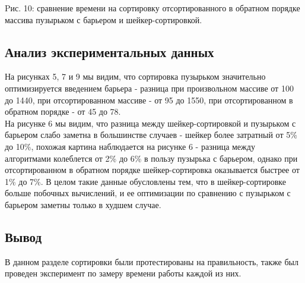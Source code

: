 \documentclass[a4paper, 14pt]{article}
\begin{document}
\begin{center}
\begin{flushleft}
Pис. 10: сравнение времени на сортировку отсортированного в обратном порядке массива пузырьком с барьером и шейкер-сортировкой.\\
\end{flushleft}
\end{center}
\subsection{Анализ экспериментальных данных}
	На рисунках 5, 7 и 9 мы видим, что сортировка пузырьком значительно оптимизируется введением барьера - разница при произвольном массиве от 100 до 1440, при отсортированном массиве - от 95 до 1550, при отсортированном в обратном порядке - от 45 до 78.\\
	На рисунке 6 мы видим, что разница между шейкер-сортировкой и пузырьком с барьером слабо заметна в большинстве случаев - шейкер более затратный от 5\% до 10\%, похожая картина наблюдается на рисунке 6 - разница между алгоритмами колеблется от 2\% до 6\% в пользу пузырька с барьером, однако при отсортированном в обратном порядке шейкер-сортировка оказывается быстрее от 1\% до  7\%. В целом такие данные обусловлены тем, что в шейкер-сортировке больше побочных вычислений, и ее оптимизации по сравнению с пузырьком с барьером заметны только в худшем случае. 
	\subsection{Вывод}
		В данном разделе сортировки были протестированы на правильность, также был проведен эксперимент по замеру времени работы каждой из них.
  


    	\newpage
\end{document}
